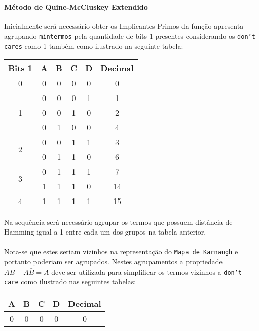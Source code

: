 \documentclass{article}
\begin{document}
\begin{resolution}
                \paragraph{Método de Quine-McCluskey Extendido}Inicialmente será necessário obter os Implicantes Primos da função apresenta agrupando \texttt{mintermos} pela quantidade de bits 1 presentes considerando os \texttt{don't cares} como 1 também como ilustrado na seguinte tabela:
                \begin{table}[H]
                    \centering\begin{tabular}{c cccc c}
                        Bits 1             &A&B&C&D& Decimal\\\hline
                        0                  &0&0&0&0& 0\\\hline
                        \multirow{3}{*}{1} &0&0&0&1& 1\\
                                           &0&0&1&0& 2\\
                                           &0&1&0&0& 4\\\hline
                        \multirow{2}{*}{2} &0&0&1&1& 3\\
                                           &0&1&1&0& 6\\\hline
                        \multirow{2}{*}{3} &0&1&1&1& 7\\
                                           &1&1&1&0& 14\\\hline
                        4                  &1&1&1&1& 15\\\hline
                    \end{tabular}
                \end{table}\noindent
                Na sequência será necessário agrupar os termos que possuem distância de Hamming igual a 1 entre cada um dos grupos na tabela anterior.
                \\\\
                Nota-se que estes seriam vizinhos na representação do \texttt{Mapa de Karnaugh} e portanto poderiam ser agrupados. Nestes agrupamentos a propriedade $AB + A\bar{B} = A$ deve ser utilizada para simplificar os termos vizinhos a \texttt{don't care} como ilustrado nas seguintes tabelas:
                \begin{table}[H]
                    \centering\begin{tabular}{cccc c}
                        A&B&C&D& Decimal\\\hline
                        0&0&0&0& 0\\\hline

\end{tabular}
\end{table}
\end{resolution}
\end{document}
